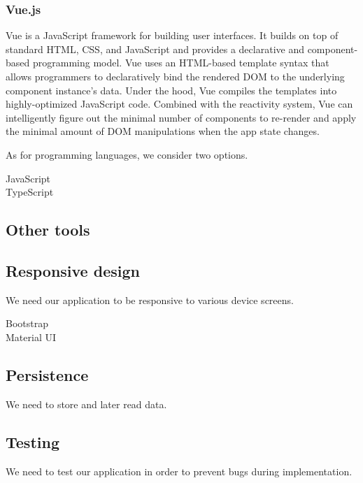 \subsubsection*{Vue.js}
Vue is a JavaScript framework for building user interfaces. 
It builds on top of standard HTML, CSS, and JavaScript and provides a declarative and component-based programming model.
Vue uses an HTML-based template syntax that allows programmers to declaratively bind the rendered DOM to the underlying component instance's data.
Under the hood, Vue compiles the templates into highly-optimized JavaScript code. 
Combined with the reactivity system, Vue can intelligently figure out the minimal number of components to re-render and apply the minimal amount of DOM manipulations when the app state changes.



As for programming languages, we consider two options. 

\begin{description}
  \item[JavaScript] 
  \item[TypeScript] 
\end{description}


\subsection{Other tools}

\subsection{Responsive design}
We need our application to be responsive to various device screens.
\begin{description}
  \item[Bootstrap] 
  \item[Material UI] 
\end{description}

\subsection{Persistence}
We need to store and later read data.

\subsection{Testing}
We need to test our application in order to prevent bugs during implementation.

